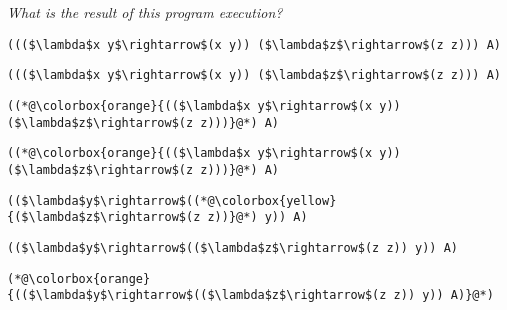 \documentclass{beamer}
\begin{document}
\begin{frame}[fragile]{\CurrentSection}
\begin{exampleblock}{}
\textit{What is the result of this program execution?}
\end{exampleblock}

 
\lstset{basicstyle=\ttfamily\small}\lstset{numbers=none}\lstset{language=ML}\begin{lstlisting}
((($\lambda$x y$\rightarrow$(x y)) ($\lambda$z$\rightarrow$(z z))) A)
\end{lstlisting}
 

\end{frame}

\begin{frame}[fragile]{\CurrentSection}
\lstset{basicstyle=\ttfamily\small}\lstset{numbers=none}\lstset{language=ML}\begin{lstlisting}
((($\lambda$x y$\rightarrow$(x y)) ($\lambda$z$\rightarrow$(z z))) A)
\end{lstlisting}
\pause\lstset{language=ML}\begin{lstlisting}
((*@\colorbox{orange}{(($\lambda$x y$\rightarrow$(x y)) ($\lambda$z$\rightarrow$(z z)))}@*) A)
\end{lstlisting}

\end{frame}

\begin{frame}[fragile]{\CurrentSection}
\lstset{basicstyle=\ttfamily\small}\lstset{numbers=none}\lstset{language=ML}\begin{lstlisting}
((*@\colorbox{orange}{(($\lambda$x y$\rightarrow$(x y)) ($\lambda$z$\rightarrow$(z z)))}@*) A)
\end{lstlisting}
\pause\lstset{language=ML}\begin{lstlisting}
(($\lambda$y$\rightarrow$((*@\colorbox{yellow}{($\lambda$z$\rightarrow$(z z))}@*) y)) A)
\end{lstlisting}

\end{frame}

\begin{frame}[fragile]{\CurrentSection}
\lstset{basicstyle=\ttfamily\small}\lstset{numbers=none}\lstset{language=ML}\begin{lstlisting}
(($\lambda$y$\rightarrow$(($\lambda$z$\rightarrow$(z z)) y)) A)
\end{lstlisting}
\pause\lstset{language=ML}\begin{lstlisting}
(*@\colorbox{orange}{(($\lambda$y$\rightarrow$(($\lambda$z$\rightarrow$(z z)) y)) A)}@*)
\end{lstlisting}

\end{frame}
\end{document}
